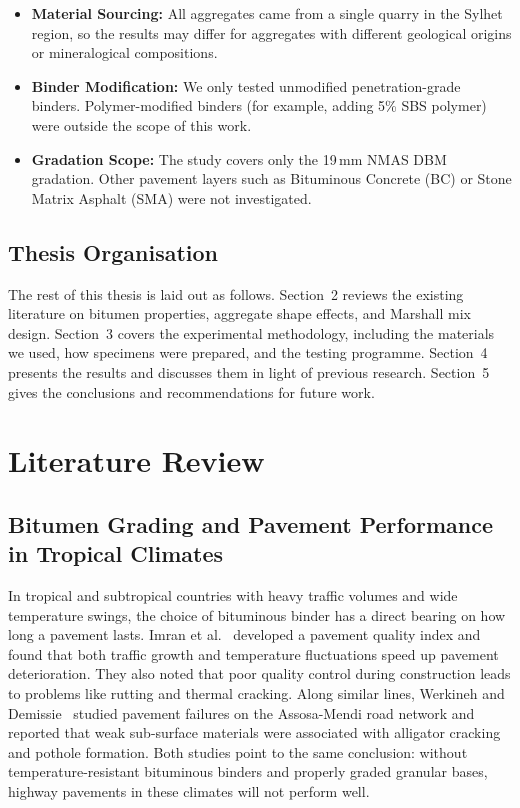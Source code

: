 \documentclass[12pt,a4paper]{article}
\begin{document}
\begin{itemize}
    A fuller measure would have been the Particle Index (PI), which captures the combined contributions of particle shape, angularity, and surface texture to dense packing and internal resistance. We did not determine the PI or the sphericity-based metrics in this study, and this is a limitation worth noting.
    \item \textbf{Material Sourcing:} All aggregates came from a single quarry in the Sylhet region, so the results may differ for aggregates with different geological origins or mineralogical compositions.
    \item \textbf{Binder Modification:} We only tested unmodified penetration-grade binders. Polymer-modified binders (for example, adding 5\% SBS polymer) were outside the scope of this work.
    \item \textbf{Gradation Scope:} The study covers only the 19\,mm NMAS DBM gradation. Other pavement layers such as Bituminous Concrete (BC) or Stone Matrix Asphalt (SMA) were not investigated.
\end{itemize}

\subsection{Thesis Organisation}

The rest of this thesis is laid out as follows. Section~2 reviews the existing literature on bitumen properties, aggregate shape effects, and Marshall mix design. Section~3 covers the experimental methodology, including the materials we used, how specimens were prepared, and the testing programme. Section~4 presents the results and discusses them in light of previous research. Section~5 gives the conclusions and recommendations for future work.



\section{Literature Review}

\subsection{Bitumen Grading and Pavement Performance in Tropical Climates}
In tropical and subtropical countries with heavy traffic volumes and wide temperature swings, the choice of bituminous binder has a direct bearing on how long a pavement lasts. Imran et al.~\cite{imran2025developing} developed a pavement quality index and found that both traffic growth and temperature fluctuations speed up pavement deterioration. They also noted that poor quality control during construction leads to problems like rutting and thermal cracking. Along similar lines, Werkineh and Demissie~\cite{werkineh2020assessment} studied pavement failures on the Assosa-Mendi road network and reported that weak sub-surface materials were associated with alligator cracking and pothole formation. Both studies point to the same conclusion: without temperature-resistant bituminous binders and properly graded granular bases, highway pavements in these climates will not perform well.
\end{document}
